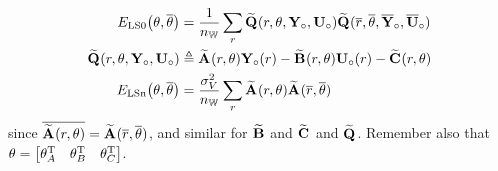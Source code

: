 \begin{align}
   \ELSCost[0]{\theta,\conj{\theta}} & =
      \frac{1}{\nWind}
           \sum_{r}
           \LocalModel{Q}(      r,        \LocalVector{\theta},  \true{      \LocalVector{Y}},  \true{      \LocalVector{U} })
           \LocalModel{Q}(\conj{r}, \conj{\LocalVector{\theta}}, \true{\conj{\LocalVector{Y}}}, \true{\conj{\LocalVector{U}}})
   \\
   \LocalModel{Q}(r, \LocalVector{\theta},  \true{\LocalVector{Y}},  \true{ \LocalVector{U} }) & \isdef
                 \LocalModel{A}(r, \LocalVector{\theta}) \true{\LocalVector{Y}}(r)
               - \LocalModel{B}(r, \LocalVector{\theta}) \true{\LocalVector{U}}(r)
               - \LocalModel{C}(r, \LocalVector{\theta})
    \\             
    \ELSCost[n]{\theta,\conj{\theta}} & =
              \frac{\sigma_V^2}{\nWind} 
                     \sum_{r} 
                               \LocalModel{A}(      r,        \LocalVector{\theta} ) 
                               \LocalModel{A}(\conj{r}, \conj{\LocalVector{\theta}}) 
\end{align}
since $\conj{ \LocalModel{A}(r,\theta)} =  \LocalModel{A}(\conj{r},\conj{\theta}) $, and similar for $\LocalModel{B}$ and $\LocalModel{C}$ and $\LocalModel{Q}$.
Remember also that $\theta = \mat{\theta_A^{\TT} & \theta_B^{\TT} & \theta_C^{\TT}}$.

